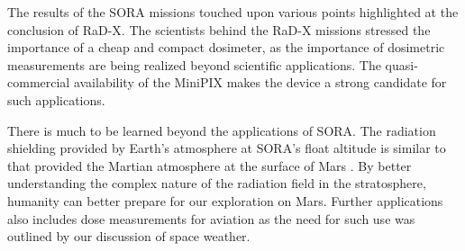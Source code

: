 The results of the SORA missions touched upon various points highlighted at the conclusion of RaD-X. The scientists behind the RaD-X missions stressed the importance of a cheap and compact dosimeter, as the importance of dosimetric measurements are being realized beyond scientific applications. The quasi-commercial availability of the MiniPIX makes the device a strong candidate for such applications.

There is much to be learned beyond the applications of SORA. The radiation shielding provided by Earth's atmosphere at SORA's float altitude is similar to that provided the Martian atmosphere at the surface of Mars \cite{rad-x}. By better understanding the complex nature of the radiation field in the stratosphere, humanity can better prepare for our exploration on Mars. Further applications also includes dose measurements for aviation as the need for such use was outlined by our discussion of space weather.



